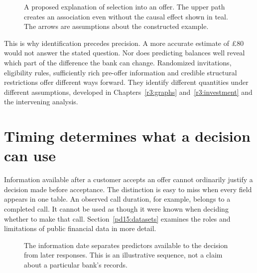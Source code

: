 \begin{figure}[htbp]\centering
{}
\caption{A proposed explanation of selection into an offer. The upper path
creates an association even without the causal effect shown in teal. The
arrows are assumptions about the constructed example.}
\label{reading:selection}
\end{figure}

This is why identification precedes precision. A more accurate estimate of
\pounds80 would not answer the stated question. Nor does predicting balances
well reveal which part of the difference the bank can change. Randomized
invitations, eligibility rules, sufficiently rich pre-offer information and
credible structural restrictions offer different ways forward. They identify
different quantities under different assumptions, developed in
Chapters~\ref{r3:graphs} and~\ref{r3:investment} and the intervening analysis.

\section{Timing determines what a decision can use}

Information available after a customer accepts an offer cannot ordinarily
justify a decision made before acceptance. The distinction is easy to miss
when every field appears in one table. An observed call duration, for example,
belongs to a completed call. It cannot be used as though it were known when
deciding whether to make that call. Section~\ref{pd15:datasets} examines the
roles and limitations of public financial data in more detail.

\begin{figure}[htbp]\centering
{}
\caption{The information date separates predictors available to the decision
from later responses. This is an illustrative sequence, not a claim about a
particular bank's records.}
\label{reading:time}
\end{figure}

